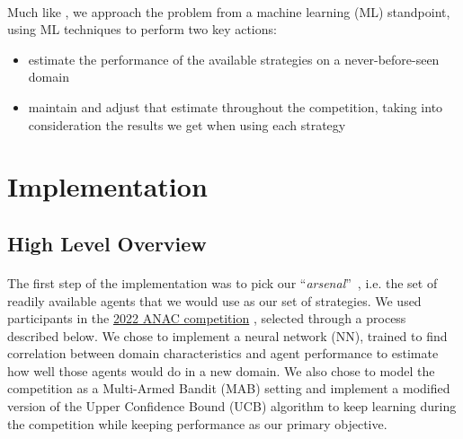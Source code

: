 \documentclass[12pt]{article}
\numberwithin{equation}{section}
\newcommand{\quotes}[1]{\textquotedblleft #1\textquotedblright \ }
\begin{document}
		\paragraph*{}
			Much like \cite{meta_agent_paper}, we approach the problem from a machine learning (ML) standpoint, using ML techniques to perform two key actions:
			\begin{itemize}
				\item estimate the performance of the available strategies on a never-before-seen domain
				\item maintain and adjust that estimate throughout the competition, taking into consideration the results we get when using each strategy
			\end{itemize}

	\section{Implementation}		\label{sec:implementation}

		\subsection{High Level Overview}	\label{sec:implementation.high_level_view}

			\paragraph*{}
				The first step of the implementation was to pick our \quotes{\emph{arsenal}}, i.e. the set of readily available agents that we would use as our set of strategies. We used participants in the \href{https://web.tuat.ac.jp/~katfuji/ANAC2022/}{2022 ANAC competition} \cite{ANAC}, selected through a process described below. We chose to implement a neural network (NN), trained to find correlation between domain characteristics and agent performance to estimate how well those agents would do in a new domain. We also chose to model the competition as a Multi-Armed Bandit (MAB) %
				setting and implement a modified version of the Upper Confidence Bound (UCB) algorithm to keep learning during the competition while keeping performance as our primary objective.
\end{document}
